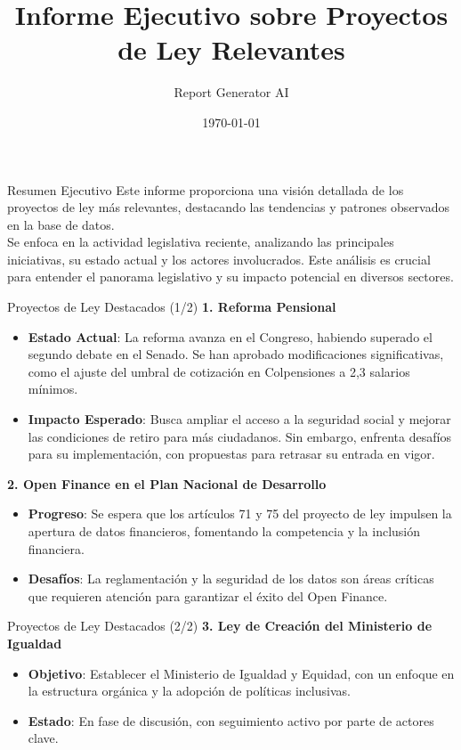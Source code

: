 \documentclass{beamer}
\title{Informe Ejecutivo sobre Proyectos de Ley Relevantes}
\author{Report Generator AI}
\date{\today}
\begin{document}
\begin{frame}
    \titlepage
\end{frame}

\begin{frame}{Resumen Ejecutivo}
Este informe proporciona una visión detallada de los proyectos de ley más relevantes, destacando las tendencias y patrones observados en la base de datos.\\

Se enfoca en la actividad legislativa reciente, analizando las principales iniciativas, su estado actual y los actores involucrados. Este análisis es crucial para entender el panorama legislativo y su impacto potencial en diversos sectores.
\end{frame}

\begin{frame}{Proyectos de Ley Destacados (1/2)}
\textbf{1. Reforma Pensional}
\begin{itemize}
    \item \textbf{Estado Actual}: La reforma avanza en el Congreso, habiendo superado el segundo debate en el Senado. Se han aprobado modificaciones significativas, como el ajuste del umbral de cotización en Colpensiones a 2,3 salarios mínimos.
    \item \textbf{Impacto Esperado}: Busca ampliar el acceso a la seguridad social y mejorar las condiciones de retiro para más ciudadanos. Sin embargo, enfrenta desafíos para su implementación, con propuestas para retrasar su entrada en vigor.
\end{itemize}

\vspace{1ex}
\textbf{2. Open Finance en el Plan Nacional de Desarrollo}
\begin{itemize}
    \item \textbf{Progreso}: Se espera que los artículos 71 y 75 del proyecto de ley impulsen la apertura de datos financieros, fomentando la competencia y la inclusión financiera.
    \item \textbf{Desafíos}: La reglamentación y la seguridad de los datos son áreas críticas que requieren atención para garantizar el éxito del Open Finance.
\end{itemize}
\end{frame}

\begin{frame}{Proyectos de Ley Destacados (2/2)}
\textbf{3. Ley de Creación del Ministerio de Igualdad}
\begin{itemize}
    \item \textbf{Objetivo}: Establecer el Ministerio de Igualdad y Equidad, con un enfoque en la estructura orgánica y la adopción de políticas inclusivas.
    \item \textbf{Estado}: En fase de discusión, con seguimiento activo por parte de actores clave.
\end{itemize}
\end{frame}
\end{document}
